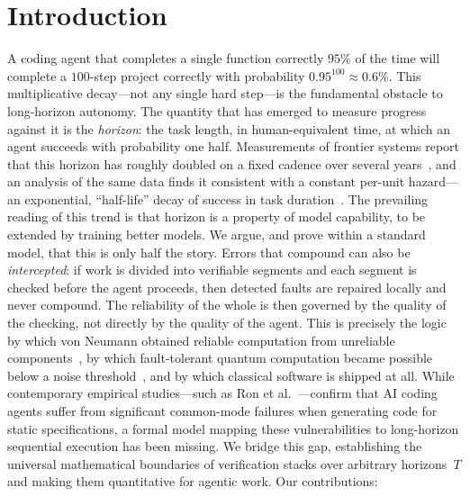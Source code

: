 \documentclass[11pt]{article}
\theoremstyle{remark}
\begin{document}
\section{Introduction}
A coding agent that completes a single function correctly $95\%$ of the time will complete a
$100$-step project correctly with probability $0.95^{100}\approx 0.6\%$.
This multiplicative
decay---not any single hard step---is the fundamental obstacle to long-horizon autonomy.
The
quantity that has emerged to measure progress against it is the \emph{horizon}: the task length,
in human-equivalent time, at which an agent succeeds with probability one half.
Measurements of
frontier systems report that this horizon has roughly doubled on a fixed cadence over several
years~\cite{metr2025}, and an analysis of the same data finds it consistent with a constant
per-unit hazard---an exponential, ``half-life'' decay of success in task duration~\cite{ord2025}.
The prevailing reading of this trend is that horizon is a property of model capability, to be
extended by training better models.
We argue, and prove within a standard model, that this is only
half the story.
Errors that compound can also be \emph{intercepted}: if work is divided into
verifiable segments and each segment is checked before the agent proceeds, then detected faults
are repaired locally and never compound.
The reliability of the whole is then governed by the
quality of the checking, not directly by the quality of the agent.
This is precisely the logic by
which von Neumann obtained reliable computation from unreliable components~\cite{vonneumann1956},
by which fault-tolerant quantum computation became possible below a noise
threshold~\cite{aharonov1997}, and by which classical software is shipped at all.
While contemporary empirical studies---such as Ron et al.~\cite{ron2026}---confirm that AI
coding agents suffer from significant common-mode failures when generating code for static
specifications, a formal model mapping these vulnerabilities to long-horizon sequential
execution has been missing.
We bridge this gap, establishing the universal mathematical
boundaries of verification stacks over arbitrary horizons~$T$ and making them quantitative for
agentic work. Our contributions:
\end{document}
